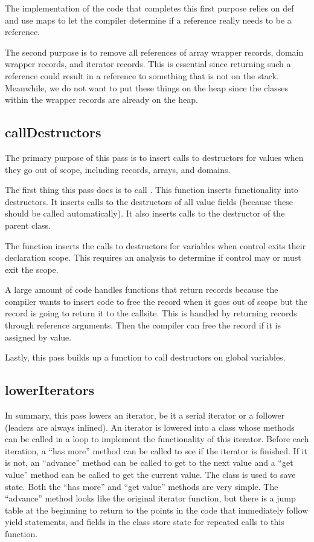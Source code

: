\documentclass[10pt]{article}
\begin{document}
The implementation of the code that completes this first purpose
relies on def and use maps to let the compiler determine if a
reference really needs to be a reference.

The second purpose is to remove all references of array wrapper
records, domain wrapper records, and iterator records.  This is
essential since returning such a reference could result in a reference
to something that is not on the stack.  Meanwhile, we do not want to
put these things on the heap since the classes within the wrapper
records are already on the heap.

\subsection{callDestructors}

The primary purpose of this pass is to insert calls to destructors for
values when they go out of scope, including records, arrays, and
domains.

The first thing this pass does is to call .  This
function inserts functionality into destructors.  It inserts calls to
the destructors of all value fields (because these should be called
automatically).  It also inserts calls to the destructor of the parent
class.

The function  inserts the calls to
destructors for variables when control exits their declaration scope.
This requires an analysis to determine if control may or must exit the
scope.

A large amount of code handles functions that return records because
the compiler wants to insert code to free the record when it goes out
of scope but the record is going to return it to the callsite.  This
is handled by returning records through reference arguments.  Then the
compiler can free the record if it is assigned by value.

Lastly, this pass builds up a function to call destructors on
global variables.

\subsection{lowerIterators}
\label{sec:lowerIterators}

In summary, this pass lowers an iterator, be it a serial
iterator or a follower (leaders are always inlined).  An iterator is lowered
into a class whose methods can be called in a loop to implement the
functionality of this iterator.  Before each iteration, a ``has more''
method can be called to see if the iterator is finished.  If it is not,
an ``advance'' method can be called
to get to the next value and a ``get value'' method can be called to
get the current value.  The class is used to save state.  Both the
``has more'' and ``get value'' methods are very simple.  The
``advance'' method looks like the original iterator function, but
there is a jump table at the beginning to return to the points in the
code that immediately follow yield statements, and fields in the class
store state for repeated calls to this function.
\end{document}

